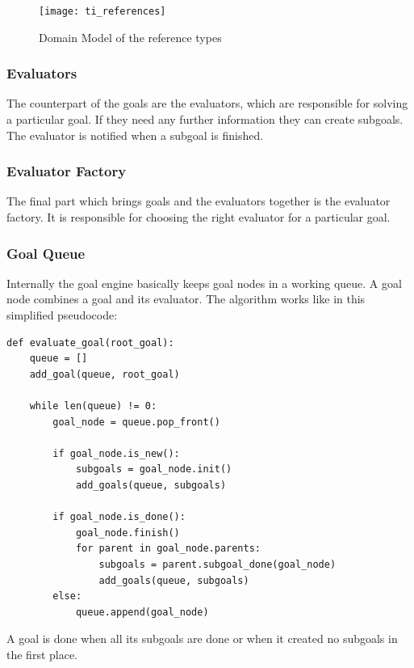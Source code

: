 \documentclass[12pt,halfparskip,DIV11,BCOR10mm]{scrreprt}
\begin{document}
\begin{figure}[H]
    \centering
    \texttt{[image: ti\_references]}
    \label{fig:ti_referenes}
    \caption{Domain Model of the reference types}
\end{figure}


\subsubsection{Evaluators}

The counterpart of the goals are the evaluators, which are responsible for solving a particular goal. If they need any further information they can create subgoals. The evaluator is notified when a subgoal is finished.

\subsubsection{Evaluator Factory}

The final part which brings goals and the evaluators together is the evaluator factory. It is responsible for choosing the right evaluator for a particular goal.

\subsubsection{Goal Queue}

Internally the goal engine  basically keeps goal nodes in a working queue. A goal node combines a goal and its evaluator. The algorithm works like in this simplified pseudocode:

\begin{lstlisting}
def evaluate_goal(root_goal):
    queue = []
    add_goal(queue, root_goal)

    while len(queue) != 0:
        goal_node = queue.pop_front()

        if goal_node.is_new():
            subgoals = goal_node.init()
            add_goals(queue, subgoals)

        if goal_node.is_done():
            goal_node.finish()
            for parent in goal_node.parents:
                subgoals = parent.subgoal_done(goal_node)
                add_goals(queue, subgoals)
        else:
            queue.append(goal_node)
\end{lstlisting}

A goal is done when all its subgoals are done or when it created no subgoals in the first place.
\end{document}
